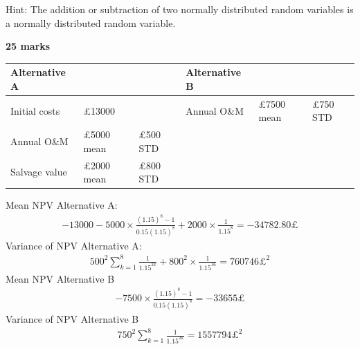 Hint: The addition or subtraction of two normally distributed random variables is a normally distributed random variable.

\textbf{25 marks}

\begin{table}[H]
    \centering
    \begin{tabular}{@{}llllll@{}}
        \toprule
        Alternative A &                   &                 & Alternative B &                   &                 \\
        \midrule
        Initial costs & \pounds 13000     &                 & Annual O\&M   & \pounds 7500 mean & \pounds 750 STD \\
        Annual O\&M   & \pounds 5000 mean & \pounds 500 STD &               &                   &                 \\
        Salvage value & \pounds 2000 mean & \pounds 800 STD &               &                   &                 \\
        \bottomrule
    \end{tabular}
\end{table}
Mean NPV Alternative A:
\begin{gather}
    -13000 - 5000\times \frac{\left(1.15\right)^8 - 1}{0.15\left(1.15\right)^8} + 2000\times \frac{1}{1.15^8} = -34782.80 \pounds
\end{gather}
Variance of NPV Alternative A:
\begin{gather}
    500^2 \sum_{k=1}^8 \frac{1}{1.15^{2k}} + 800^2 \times \frac{1}{1.15^16} = 760746\pounds^2
\end{gather}
Mean NPV Alternative B
\begin{gather}
    -7500\times \frac{\left(1.15\right)^8 - 1}{0.15\left(1.15\right)^8} = -33655\pounds
\end{gather}
Variance of NPV Alternative B
\begin{gather}
    750^2\sum_{k=1}^8 \frac{1}{1.15^{2k}} = 1557794\pounds^2
\end{gather}
